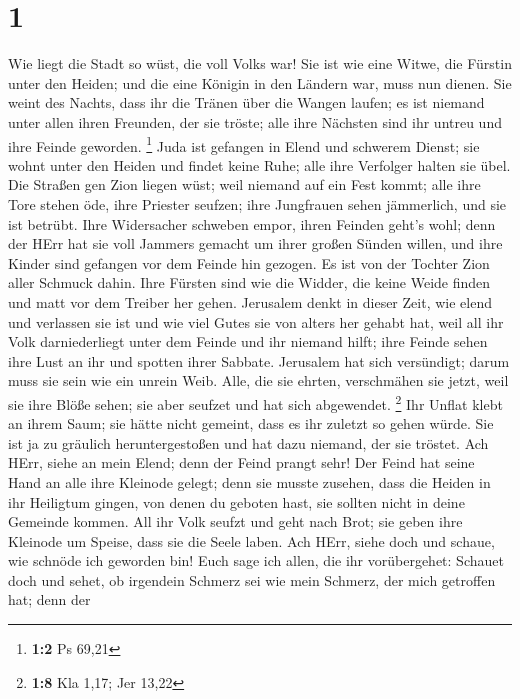 \hypertarget{section}{%
\section{1}\label{section}}

 Wie liegt die Stadt so wüst, die voll Volks war! Sie ist
wie eine Witwe, die Fürstin unter den Heiden; und die eine Königin in
den Ländern war, muss nun dienen.  Sie weint des Nachts,
dass ihr die Tränen über die Wangen laufen; es ist niemand unter allen
ihren Freunden, der sie tröste; alle ihre Nächsten sind ihr untreu und
ihre Feinde geworden. \footnote{\textbf{1:2} Ps 69,21}  Juda
ist gefangen in Elend und schwerem Dienst; sie wohnt unter den Heiden
und findet keine Ruhe; alle ihre Verfolger halten sie übel. 
Die Straßen gen Zion liegen wüst; weil niemand auf ein Fest kommt; alle
ihre Tore stehen öde, ihre Priester seufzen; ihre Jungfrauen sehen
jämmerlich, und sie ist betrübt.  Ihre Widersacher schweben
empor, ihren Feinden geht's wohl; denn der HErr hat sie voll Jammers
gemacht um ihrer großen Sünden willen, und ihre Kinder sind gefangen vor
dem Feinde hin gezogen.  Es ist von der Tochter Zion aller
Schmuck dahin. Ihre Fürsten sind wie die Widder, die keine Weide finden
und matt vor dem Treiber her gehen.  Jerusalem denkt in
dieser Zeit, wie elend und verlassen sie ist und wie viel Gutes sie von
alters her gehabt hat, weil all ihr Volk darniederliegt unter dem Feinde
und ihr niemand hilft; ihre Feinde sehen ihre Lust an ihr und spotten
ihrer Sabbate.  Jerusalem hat sich versündigt; darum muss
sie sein wie ein unrein Weib. Alle, die sie ehrten, verschmähen sie
jetzt, weil sie ihre Blöße sehen; sie aber seufzet und hat sich
abgewendet. \footnote{\textbf{1:8} Kla 1,17; Jer 13,22}  Ihr
Unflat klebt an ihrem Saum; sie hätte nicht gemeint, dass es ihr zuletzt
so gehen würde. Sie ist ja zu gräulich heruntergestoßen und hat dazu
niemand, der sie tröstet. Ach HErr, siehe an mein Elend; denn der Feind
prangt sehr!  Der Feind hat seine Hand an alle ihre
Kleinode gelegt; denn sie musste zusehen, dass die Heiden in ihr
Heiligtum gingen, von denen du geboten hast, sie sollten nicht in deine
Gemeinde kommen.  All ihr Volk seufzt und geht nach Brot;
sie geben ihre Kleinode um Speise, dass sie die Seele laben. Ach HErr,
siehe doch und schaue, wie schnöde ich geworden bin!  Euch
sage ich allen, die ihr vorübergehet: Schauet doch und sehet, ob
irgendein Schmerz sei wie mein Schmerz, der mich getroffen hat; denn der
